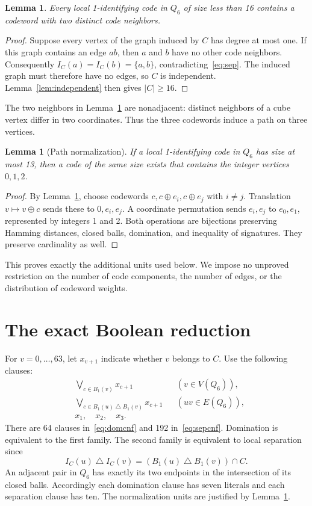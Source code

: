 \documentclass[11pt]{article}
\newtheorem{lemma}[theorem]{Lemma}
\newcommand{\B}{B_1}
\newcommand{\sym}{\mathbin{\triangle}}
\begin{document}
\begin{lemma}\label{lem:path}
Every local 1-identifying code in $Q_6$ of size less than 16 contains a codeword with two distinct code neighbors.
\end{lemma}
\begin{proof}
Suppose every vertex of the graph induced by $C$ has degree at most one. If this graph contains an edge $ab$, then $a$ and $b$ have no other code neighbors. Consequently $I_C(a)=I_C(b)=\{a,b\}$, contradicting~\eqref{eq:sep}. The induced graph must therefore have no edges, so $C$ is independent. Lemma~\ref{lem:independent} then gives $|C|\geq16$.
\end{proof}
The two neighbors in Lemma~\ref{lem:path} are nonadjacent: distinct neighbors of a cube vertex differ in two coordinates. Thus the three codewords induce a path on three vertices.

\begin{lemma}[Path normalization]\label{lem:normalize}
If a local 1-identifying code in $Q_6$ has size at most 13, then a code of the same size exists that contains the integer vertices $0,1,2$.
\end{lemma}
\begin{proof}
By Lemma~\ref{lem:path}, choose codewords $c,c\oplus e_i,c\oplus e_j$ with $i\ne j$. Translation $v\mapsto v\oplus c$ sends these to $0,e_i,e_j$. A coordinate permutation sends $e_i,e_j$ to $e_0,e_1$, represented by integers 1 and 2. Both operations are bijections preserving Hamming distances, closed balls, domination, and inequality of signatures. They preserve cardinality as well.
\end{proof}
This proves exactly the additional units used below. We impose no unproved restriction on the number of code components, the number of edges, or the distribution of codeword weights.

\section{The exact Boolean reduction}\label{sec:encoding}
For $v=0,\ldots,63$, let $x_{v+1}$ indicate whether $v$ belongs to $C$. Use the following clauses:
\begin{align}
 &\bigvee_{c\in\B(v)}x_{c+1}
 &&(v\in V(Q_6)),\label{eq:domcnf}\\
 &\bigvee_{c\in\B(u)\sym\B(v)}x_{c+1}
 &&(uv\in E(Q_6)),\label{eq:sepcnf}\\
 &x_1,\quad x_2,\quad x_3.\label{eq:units}
\end{align}
There are 64 clauses in~\eqref{eq:domcnf} and 192 in~\eqref{eq:sepcnf}. Domination is equivalent to the first family. The second family is equivalent to local separation since
\[
 I_C(u)\sym I_C(v)=(\B(u)\sym\B(v))\cap C.
\]
An adjacent pair in $Q_6$ has exactly its two endpoints in the intersection of its closed balls. Accordingly each domination clause has seven literals and each separation clause has ten. The normalization units are justified by Lemma~\ref{lem:normalize}.
\end{document}
